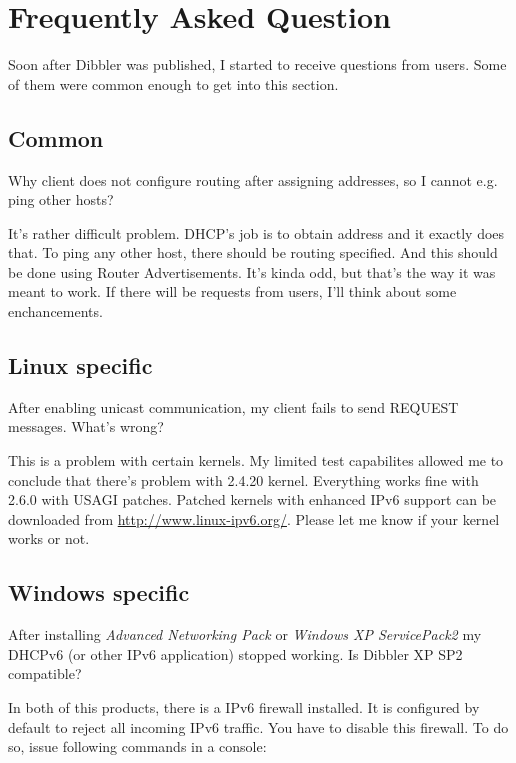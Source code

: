 

\section{Frequently Asked Question}

Soon after Dibbler was published, I started to receive questions from
users. Some of them were common enough to get into this section.

\subsection{Common}

\Q Why client does not configure routing after assigning addresses, so
I cannot e.g. ping other hosts?

\A It's rather difficult problem. DHCP's job is to obtain address and
it exactly does that. To ping any other host, there should be routing
specified. And this should be done using Router Advertisements. It's
kinda odd, but that's the way it was meant to work. If there will be
requests from users, I'll think about some enchancements.

\subsection{Linux specific}

\Q After enabling unicast communication, my client fails to send
REQUEST messages. What's wrong?

\A This is a problem with certain kernels. My limited test capabilites
allowed me to conclude that there's problem with 2.4.20
kernel. Everything works fine with 2.6.0 with USAGI patches. Patched 
kernels with enhanced IPv6 support can be downloaded from
\url{http://www.linux-ipv6.org/}. Please let me know if your kernel
works or not.

\subsection{Windows specific}

\Q After installing \emph{Advanced Networking Pack} or \emph{Windows XP
  ServicePack2} my DHCPv6 (or other IPv6 application) stopped
   working. Is Dibbler XP SP2 compatible?

\A In both of this products, there is a IPv6 firewall installed. It
is configured by default to reject all incoming IPv6 traffic. You have
to disable this firewall. To do so, issue following commands in a
console:

\begin{verbatim}

\end{verbatim}

